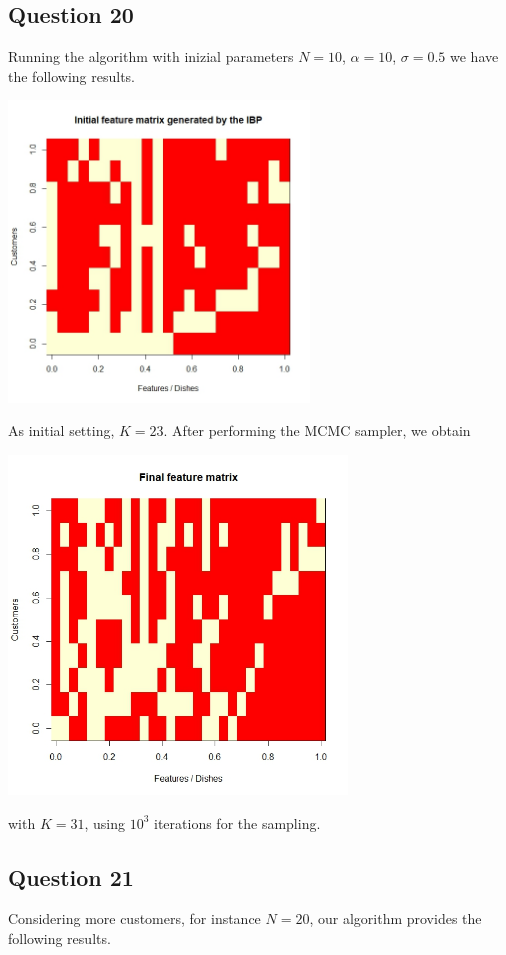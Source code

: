 \documentclass[]{article}
\begin{document}
\subsection*{Question 20}
Running the algorithm with inizial parameters $N = 10$, $\alpha = 10$, $\sigma=0.5$ we have the following results.
\\
\begin{center}
	\includegraphics[width=8cm]{task7/output_initial_alpha10_sigma05_N10.jpeg}
\end{center}
As initial setting, $K=23$. After performing the MCMC sampler, we obtain
\\
\begin{center}
	\includegraphics[width=9cm]{task7/output_final_alpha10_sigma05_N10.jpeg}
\end{center}
with $K=31$, using $10^3$ iterations for the sampling. 


\subsection*{Question 21}
Considering more customers, for instance $N=20$, our algorithm provides the following results.
\end{document}
